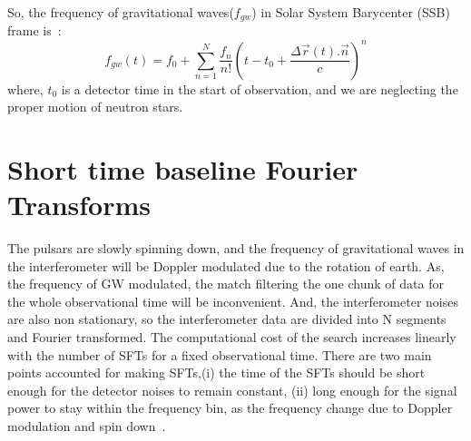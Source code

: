 \documentclass{ttuthes2007}
\begin{document}
So, the frequency of gravitational waves($f_{gw}$) in Solar System Barycenter
(SSB) frame is~\cite{Krishnan_2004}:
\begin{equation}
f_{gw}(t) = f_0 + \sum_{n=1}^{N} \frac{f_n}{n!}\left(t - t_0 + \frac{\Delta
\vec{r}(t). \vec{n}}{c}\right)^n
\end{equation}
where, $t_0$ is a detector time in the start of observation, and we are
neglecting the proper motion of neutron stars. 

\section{Short time baseline Fourier Transforms}
The pulsars are slowly spinning down, and the frequency of gravitational waves
in the interferometer will be Doppler modulated due to the rotation of earth.
As, the frequency of \ac{GW} modulated, the match filtering the one chunk of
data for the whole observational time will be inconvenient. And, the
interferometer noises are also non stationary, so the interferometer data are 
divided into N segments and Fourier transformed. The computational cost of the
search increases linearly with the number of \acp{SFT} for a fixed observational
time. There are two main points accounted for making \acp{SFT},(i) the time of the
\acp{SFT} should be short enough for the detector noises to remain constant, (ii)
long enough for the signal power to stay within the frequency bin, as the
frequency change due to Doppler modulation and spin
down~\cite{Krishnan_2004,Abbott_2007}. 
\end{document}

